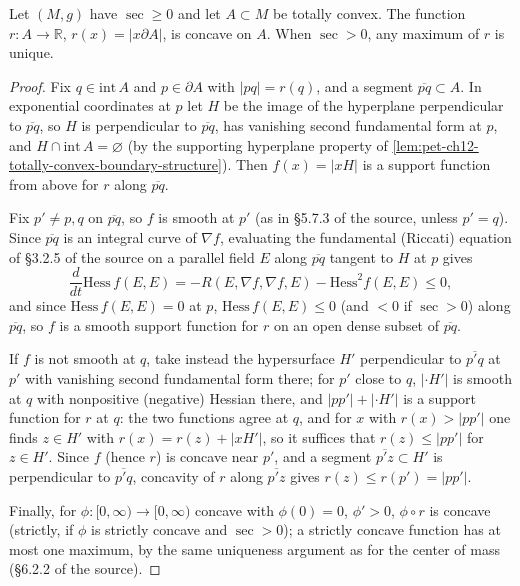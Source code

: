 \begin{lemma}
  \label{lem:pet-ch12-distance-to-boundary-concave}
  Let $(M,g)$ have $\sec\ge0$ and let $A\subset M$ be totally convex. The
  function $r:A\to\mathbb{R}$, $r(x)=|x\partial A|$, is concave on $A$. When
  $\sec>0$, any maximum of $r$ is unique.
\end{lemma}
\begin{proof}
  Fix $q\in\mathrm{int}\,A$ and $p\in\partial A$ with $|pq|=r(q)$, and a segment
  $\overline{pq}\subset A$. In exponential coordinates at $p$ let $H$ be the
  image of the hyperplane perpendicular to $\overline{pq}$, so $H$ is
  perpendicular to $\overline{pq}$, has vanishing second fundamental form at
  $p$, and $H\cap\mathrm{int}\,A=\varnothing$ (by the supporting hyperplane
  property of \cref{lem:pet-ch12-totally-convex-boundary-structure}). Then
  $f(x)=|xH|$ is a support function from above for $r$ along $\overline{pq}$.

  Fix $p'\ne p,q$ on $\overline{pq}$, so $f$ is smooth at $p'$ (as in §5.7.3 of
  the source, unless $p'=q$). Since $\overline{pq}$ is an integral curve of
  $\nabla f$, evaluating the fundamental (Riccati) equation of §3.2.5 of the
  source on a parallel field $E$ along $\overline{pq}$ tangent to $H$ at $p$
  gives
  \[
    \frac{d}{dt}\mathrm{Hess}\,f(E,E)=-R(E,\nabla f,\nabla f,E)-\mathrm{Hess}^2f(E,E)\le0,
  \]
  and since $\mathrm{Hess}\,f(E,E)=0$ at $p$, $\mathrm{Hess}\,f(E,E)\le0$ (and
  $<0$ if $\sec>0$) along $\overline{pq}$, so $f$ is a smooth support function
  for $r$ on an open dense subset of $\overline{pq}$.

  If $f$ is not smooth at $q$, take instead the hypersurface $H'$ perpendicular
  to $\overline{p'q}$ at $p'$ with vanishing second fundamental form there; for
  $p'$ close to $q$, $|{\cdot}H'|$ is smooth at $q$ with nonpositive (negative)
  Hessian there, and $|pp'|+|{\cdot}H'|$ is a support function for $r$ at $q$:
  the two functions agree at $q$, and for $x$ with $r(x)>|pp'|$ one finds
  $z\in H'$ with $r(x)=r(z)+|xH'|$, so it suffices that $r(z)\le|pp'|$ for
  $z\in H'$. Since $f$ (hence $r$) is concave near $p'$, and a segment
  $\overline{p'z}\subset H'$ is perpendicular to $\overline{p'q}$, concavity of
  $r$ along $\overline{p'z}$ gives $r(z)\le r(p')=|pp'|$.

  Finally, for $\phi:[0,\infty)\to[0,\infty)$ concave with $\phi(0)=0$,
  $\phi'>0$, $\phi\circ r$ is concave (strictly, if $\phi$ is strictly concave
  and $\sec>0$); a strictly concave function has at most one maximum, by the
  same uniqueness argument as for the center of mass (§6.2.2 of the source).
\end{proof}

